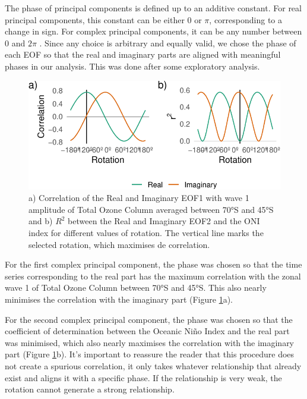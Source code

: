\documentclass[smallextended]{svjour3}       %
\begin{document}
The phase of principal components is defined up to an additive constant. For real principal components, this constant can be either 0 or \(\pi\), corresponding to a change in sign. For complex principal components, it can be any number between 0 and \(2\pi\) \citep{horel1984}. Since any choice is arbitrary and equally valid, we chose the phase of each EOF so that the real and imaginary parts are aligned with meaningful phases in our analysis. This was done after some exploratory analysis.



\begin{figure}
\centering
\includegraphics{../figures/rotations-1.pdf}
\caption{\label{fig:rotations}a) Correlation of the Real and Imaginary EOF1 with wave 1 amplitude of Total Ozone Column averaged between 70°S and 45°S and b) \(R^2\) between the Real and Imaginary EOF2 and the ONI index for different values of rotation. The vertical line marks the selected rotation, which maximises de correlation.}
\end{figure}

For the first complex principal component, the phase was chosen so that the time series corresponding to the real part has the maximum correlation with the zonal wave 1 of Total Ozone Column between 70°S and 45°S. This also nearly minimises the correlation with the imaginary part (Figure \ref{fig:rotations}a).

For the second complex principal component, the phase was chosen so that the coefficient of determination between the Oceanic Niño Index \citep{bamston1997} and the real part was minimised, which also nearly maximises the correlation with the imaginary part (Figure \ref{fig:rotations}b). It's important to reassure the reader that this procedure does not create a spurious correlation, it only takes whatever relationship that already exist and aligns it with a specific phase. If the relationship is very weak, the rotation cannot generate a strong relationship.
\end{document}
